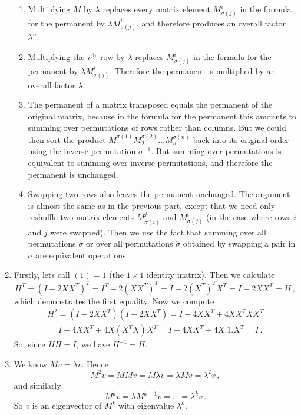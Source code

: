 \begin{enumerate}
\begin{enumerate}
\item Multiplying $M$ by $\lambda$ replaces every matrix element $M^i_{\sigma(j)}$ in the formula for the permanent
by $\lambda M^i_{\sigma(j)}$, and therefore produces an overall factor $\lambda^n$.
\item Multiplying the $i^{\rm th}$ row by $\lambda$ replaces $M^i_{\sigma(j)}$ in the formula for the permanent
by $\lambda M^i_{\sigma(j)}$. Therefore the permanent is multiplied by an overall factor $\lambda$.
\item The permanent of a matrix transposed equals the permanent of the original matrix, because
in the formula for the permanent this amounts to summing over permutations of rows rather than columns. But we could
then sort the product $M^{\sigma(1)}_1 M^{\sigma(2)}_2\ldots M^{\sigma(n)}_n$ back into its original order using the inverse permutation
 $\sigma^{-1}$. But summing over permutations is equivalent to summing over inverse permutations, and therefore the permanent is unchanged.
\item Swapping two rows also leaves the permanent unchanged. The argument is almost the same as in the previous part, except 
that we need only reshuffle two matrix elements $M^j_{\sigma(i)}$ and $M^i_{\sigma(j)}$ (in the case where rows $i$ and $j$ were swapped).
Then we use the fact that summing over all permutations $\sigma$ or over all permutations $\widetilde \sigma$ obtained
by swapping a pair in $\sigma$ are equivalent operations.
\end{enumerate}

\item Firstly, lets call $(1)=1$ (the $1\times 1$ identity matrix). Then we calculate
\[
H^T=(I-2 X X^T)^T = I^T -2 (X X^T)^T = I -2 (X^T)^T X^T = I - 2 X X^T = H\, ,
\]
which demonstrates the first equality. Now we compute
\begin{gather*}
H^2 = (I-2 X X^T) (I - 2 X X^T) = I - 4 X X^T + 4 X X^T X X^T \\= I - 4 X X^T + 4 X (X^T X) X^T = I - 4 X X^T + 4 X.  1  .X^T = I\, .
\end{gather*}
So, since $HH=I$, we have $H^{-1}=H$.

\item We know $Mv=\lambda v$. Hence 
\[
M^2 v = M M v = M \lambda v = \lambda M v = \lambda^2 v\, , 
\]
and similarly
\[
M^k v = \lambda M^{k-1} v = \ldots = \lambda^k v \, .
\]
So $v$ is an eigenvector of $M^k$ with eigenvalue $\lambda^k$.


\end{enumerate}
